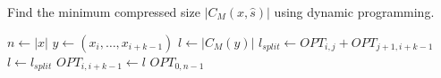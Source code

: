 \begin{algorithm}
	\caption{\label{alg:dyn}Find the minimum compressed size $|C_M(x,\hat s)|$ using dynamic programming.}
\begin{algorithmic}
\STATE $n \gets |x|$
		\STATE $y \gets (x_i,\dots,x_{i+k-1})$
		\STATE $l \gets |C_M(y)|$
			\STATE $l_{split} \gets OPT_{i,j} + OPT_{j+1,i+k-1}$
				\STATE $l \gets l_{split}$
			\ENDIF
		\ENDFOR
		\STATE $OPT_{i,i+k-1} \gets l$
	\ENDFOR
\ENDFOR
\RETURN $OPT_{0,n-1}$
\end{algorithmic}
\end{algorithm}
